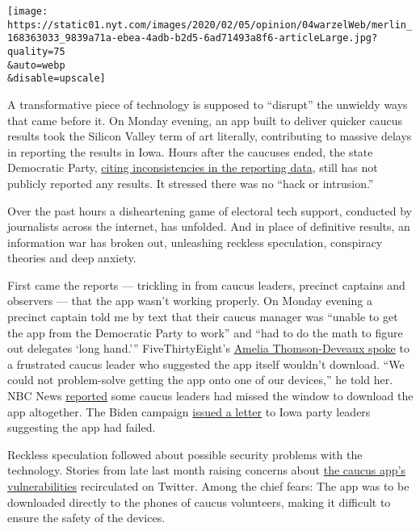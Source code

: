 \texttt{[image: https://static01.nyt.com/images/2020/02/05/opinion/04warzelWeb/merlin\_168363033\_9839a71a-ebea-4adb-b2d5-6ad71493a8f6-articleLarge.jpg?quality=75\\\&auto=webp\\\&disable=upscale]}

A transformative piece of technology is supposed to ``disrupt'' the
unwieldy ways that came before it. On Monday evening, an app built to
deliver quicker caucus results took the Silicon Valley term of art
literally, contributing to massive delays in reporting the results in
Iowa. Hours after the caucuses ended, the state Democratic Party,
\href{https://www.nytimes.com/2020/02/04/us/politics/iowa-caucus-problems.html}{citing
inconsistencies in the reporting data}, still has not publicly reported
any results. It stressed there was no ``hack or intrusion.''

Over the past hours a disheartening game of electoral tech support,
conducted by journalists across the internet, has unfolded. And in place
of definitive results, an information war has broken out, unleashing
reckless speculation, conspiracy theories and deep anxiety.

First came the reports --- trickling in from caucus leaders, precinct
captains and observers --- that the app wasn't working properly. On
Monday evening a precinct captain told me by text that their caucus
manager was ``unable to get the app from the Democratic Party to work''
and ``had to do the math to figure out delegates `long hand.'''
FiveThirtyEight's
\href{https://fivethirtyeight.com/live-blog/iowa-caucus-2020-election-live/\#255769}{Amelia
Thomson-Deveaux spoke} to a frustrated caucus leader who suggested the
app itself wouldn't download. ``We could not problem-solve getting the
app onto one of our devices,'' he told her. NBC News
\href{https://www.nbcnews.com/politics/2020-election/live-blog/iowa-caucuses-live-updates-2020-democrats-make-their-final-pitches-n1128596/ncrd1129196\#liveBlogHeader}{reported}
some caucus leaders had missed the window to download the app
altogether. The Biden campaign
\href{https://www.nbcnews.com/politics/2020-election/live-blog/iowa-caucuses-live-updates-2020-democrats-make-their-final-pitches-n1128596/ncrd1129516}{issued
a letter} to Iowa party leaders suggesting the app had failed.

Reckless speculation followed about possible security problems with the
technology. Stories from late last month raising concerns about
\href{https://www.wsj.com/articles/dems-iowa-caucus-voting-app-stirs-security-concerns-11580063221}{the
caucus app's vulnerabilities} recirculated on Twitter. Among the chief
fears: The app was to be downloaded directly to the phones of caucus
volunteers, making it difficult to ensure the safety of the devices.

